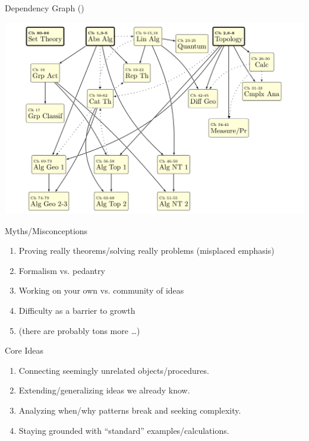 \documentclass{beamer}
\theoremstyle{plain}
\begin{document}
\begin{frame}{Dependency Graph ()}
  \begin{center}
    \includegraphics[width=\textwidth]{recent-flowchart-napkin.png}
  \end{center}  
\end{frame}

\begin{frame}{Myths/Misconceptions}
 \begin{enumerate}
  \item Proving really  theorems/solving really  problems
    (misplaced emphasis) 
   \pause
  \item Formalism vs. pedantry
   \pause
  \item Working on your own vs. community of ideas
   \pause
  \item Difficulty as a barrier to growth
   \pause
  \item (there are probably tons more \dots)  
\end{enumerate} 
\end{frame}

\begin{frame}{Core Ideas}
 \begin{enumerate}
  \item Connecting seemingly unrelated objects/procedures.  
   \pause
  \item Extending/generalizing ideas we already know. 
   \pause
  \item Analyzing when/why patterns break and seeking complexity.
   \pause
  \item Staying grounded with ``standard'' examples/calculations. 
\end{enumerate} 
\end{frame}
\end{document}
